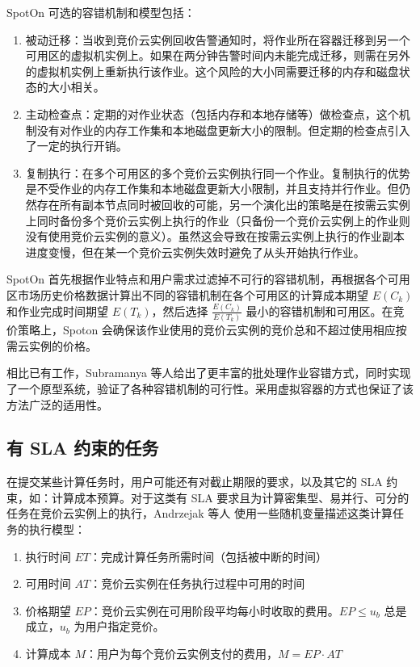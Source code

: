 SpotOn 可选的容错机制和模型包括：
\begin{enumerate}
\item 被动迁移：当收到竞价云实例回收告警通知时，将作业所在容器迁移到另一个可用区的虚拟机实例上。如果在两分钟告警时间内未能完成迁移，则需在另外的虚拟机实例上重新执行该作业。这个风险的大小同需要迁移的内存和磁盘状态的大小相关。
\item 主动检查点：定期的对作业状态（包括内存和本地存储等）做检查点，这个机制没有对作业的内存工作集和本地磁盘更新大小的限制。但定期的检查点引入了一定的执行开销。
\item 复制执行：在多个可用区的多个竞价云实例执行同一个作业。复制执行的优势是不受作业的内存工作集和本地磁盘更新大小限制，并且支持并行作业。但仍然存在所有副本节点同时被回收的可能，另一个演化出的策略是在按需云实例上同时备份多个竞价云实例上执行的作业（只备份一个竞价云实例上的作业则没有使用竞价云实例的意义）。虽然这会导致在按需云实例上执行的作业副本进度变慢，但在某一个竞价云实例失效时避免了从头开始执行作业。
\end{enumerate}

SpotOn 首先根据作业特点和用户需求过滤掉不可行的容错机制，再根据各个可用区市场历史价格数据计算出不同的容错机制在各个可用区的计算成本期望 $E(C_k)$ 和作业完成时间期望 $E(T_k)$，然后选择 $\frac{E(C_k)}{E(T_k)}$ 最小的容错机制和可用区。在竞价策略上，Spoton 会确保该作业使用的竞价云实例的竞价总和不超过使用相应按需云实例的价格。

相比已有工作，Subramanya 等人给出了更丰富的批处理作业容错方式，同时实现了一个原型系统，验证了各种容错机制的可行性。采用虚拟容器的方式也保证了该方法广泛的适用性。

\subsection{有 SLA 约束的任务}
在提交某些计算任务时，用户可能还有对截止期限的要求，以及其它的 SLA 约束，如：计算成本预算。对于这类有 SLA 要求且为计算密集型、易并行、可分的任务在竞价云实例上的执行，Andrzejak 等人 \cite{Andrzejak:2010:DMC:1906481.1906533} 使用一些随机变量描述这类计算任务的执行模型：
\begin{enumerate}
\item 执行时间 $ET$：完成计算任务所需时间（包括被中断的时间）
\item 可用时间 $AT$：竞价云实例在任务执行过程中可用的时间
\item 价格期望 $EP$：竞价云实例在可用阶段平均每小时收取的费用。$EP \leq u_b$ 总是成立，$u_b$ 为用户指定竞价。
\item 计算成本 $M$：用户为每个竞价云实例支付的费用，$M = EP \cdot AT$
\end{enumerate}

